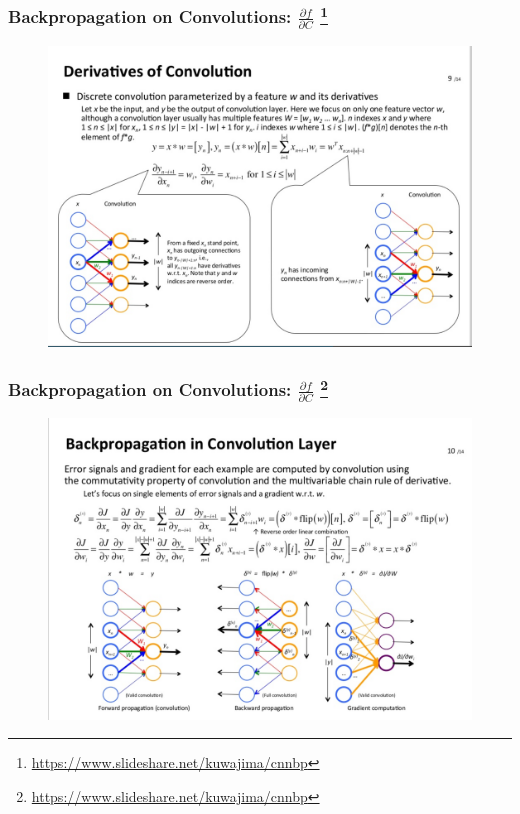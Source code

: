 \documentclass[10pt]{beamer}
\begin{document}
\begin{frame}
\frametitle{Backpropagation on Convolutions: $\frac{\partial f}{\partial C}$ \footnote{\url{https://www.slideshare.net/kuwajima/cnnbp}}}
\begin{figure}[H]
	\centerline{
		\includegraphics[width=1\textwidth]{back_conv1.png}
	}
\end{figure}
\end{frame}

\begin{frame}
\frametitle{Backpropagation on Convolutions: $\frac{\partial f}{\partial C}$ \footnote{\url{https://www.slideshare.net/kuwajima/cnnbp}}}
\begin{figure}[H]
	\centerline{
		\includegraphics[width=1\textwidth]{back_conv2.png}
	}
\end{figure}
\end{frame}
\end{document}
